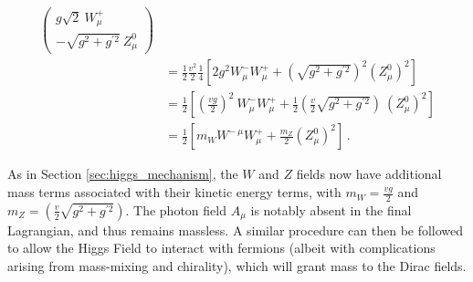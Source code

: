 \begin{equation}
\begin{split}
\begin{pmatrix}
                 g \sqrt{2}\ W^+_{\mu} \\
                 - \sqrt{g^2 + g^{\prime 2}}\ Z^0_{\mu}
            \end{pmatrix} \\
        & = \frac{1}{2} \frac{v^2}{2} \frac{1}{4} 
            \left[ 2 g^2  W^-_{\mu} W^+_{\mu}
            + \left(\sqrt{g^2 + g^{\prime 2}}\right)^2 (Z^0_{\mu})^2 \right] \\
        & = \frac{1}{2} \left[ \left(\frac{vg}{2}\right)^2\  W^-_{\mu} W^+_{\mu}
            + \frac{1}{2} \left(\frac{v}{2}\sqrt{g^2 + g^{\prime 2}}\right)\ (Z^0_{\mu})^2 \right] \\
        & = \frac{1}{2} \left[ m_W W^{-\ \mu} W^+_{\mu} + \frac{m_Z}{2} (Z^0_{\mu})^2 \right]
        \,.
    \end{split} \end{equation}

    As in Section \ref{sec:higgs_mechanism}, the $W$ and $Z$ fields now have additional mass terms associated with their kinetic energy terms,
        with $m_W = \frac{vg}{2}$ and $m_Z = \left(\frac{v}{2}\sqrt{g^2 + g^{\prime 2}}\right) $.
    The photon field $A_{\mu}$ is notably absent in the final Lagrangian, and thus remains massless.
    A similar procedure can then be followed to allow the Higgs Field to interact with fermions
        (albeit with complications arising from mass-mixing and chirality),
        which will grant mass to the Dirac fields.




